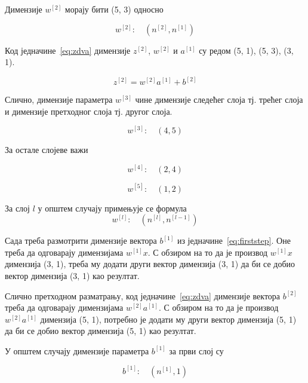 \documentclass[master]{finthesis}
\begin{document}
Димензије $w^{[2]}$ морају бити (5, 3) односно

\begin{equation}
w^{[2]} : \quad (n^{[2]}, n^{[1]})
\end{equation}

Код једначине~\eqref{eq:zdva} димензије $z^{[2]}$, $w^{[2]}$ и $a^{[1]}$ су редом (5, 1), (5, 3), (3, 1).

\begin{equation}
z^{[2]} = w^{[2]}a^{[1]} + b^{[2]}
\label{eq:zdva}
\end{equation}

Слично, димензије параметра $w^{[3]}$ чине димензије следећег слоја тј. трећег слоја и димензије претходног слоја тј. другог слоја. 

\begin{equation}
w^{[3]} : \quad (4, 5)
\end{equation}

За остале слојеве важи

\begin{equation}
w^{[4]} : \quad (2, 4)
\end{equation}

\begin{equation}
w^{[5]} : \quad (1, 2)
\end{equation}

За слој $l$ у општем случају примењује се формула 
\begin{equation}
w^{[l]} : \quad (n^{[l]}, n^{[l-1]})
\end{equation}

Сада треба размотрити димензије вектора $b^{[1]}$ из једначине~\eqref{eq:firststep}. Оне треба да одговарају димензијама $w^{[1]}x$. С обзиром на то да је производ $w^{[1]}x$ димензија (3, 1), треба му додати други вектор димензија (3, 1) да би се добио вектор димензија (3, 1) као резултат.

Слично претходном разматрању, код једначине~\eqref{eq:zdva} димензије вектора $b^{[2]}$ треба да одговарају димензијама $w^{[2]}a^{[1]}$. С обзиром на то да је производ $w^{[2]}a^{[1]}$ димензија (5, 1), потребно је додати му други вектор димензија (5, 1) да би се добио вектор димензија (5, 1) као резултат. 

\vspace{2em}
У општем случају димензије параметра $b^{[1]}$ за први слој су   

\begin{equation}
b^{[1]} : \quad (n^{[1]}, 1)
\end{equation}
\end{document}
